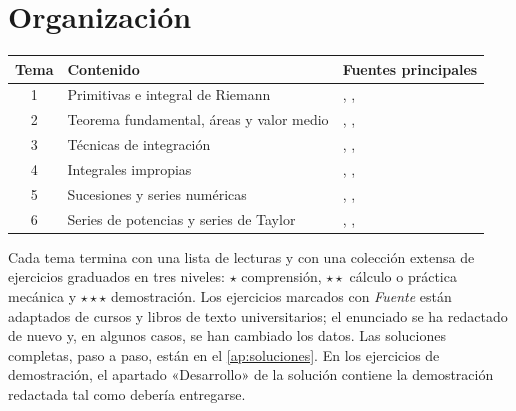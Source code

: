 \documentclass[11pt,a4paper,twoside,openany]{book}
\begin{document}
\section*{Organización}
\begin{center}
\begin{tabular}{@{}cll@{}}
\toprule
Tema & Contenido & Fuentes principales \\
\midrule
1 & Primitivas e integral de Riemann & \cite{spivak}, \cite{apostol}, \cite{openstax1} \\
2 & Teorema fundamental, áreas y valor medio & \cite{spivak}, \cite{mit1801}, \cite{openstax1} \\
3 & Técnicas de integración & \cite{openstax2}, \cite{strang}, \cite{mit1801} \\
4 & Integrales impropias & \cite{openstax2}, \cite{strang}, \cite{apostol} \\
5 & Sucesiones y series numéricas & \cite{openstax2}, \cite{strang}, \cite{spivak} \\
6 & Series de potencias y series de Taylor & \cite{openstax2}, \cite{strang}, \cite{spivak} \\
\bottomrule
\end{tabular}
\end{center}

Cada tema termina con una lista de lecturas y con una colección extensa de ejercicios graduados en tres niveles: $\star$ comprensión, $\star\star$ cálculo o práctica mecánica y $\star\star\star$ demostración. Los ejercicios marcados con \emph{Fuente} están adaptados de cursos y libros de texto universitarios; el enunciado se ha redactado de nuevo y, en algunos casos, se han cambiado los datos. Las soluciones completas, paso a paso, están en el \cref{ap:soluciones}. En los ejercicios de demostración, el apartado «Desarrollo» de la solución contiene la demostración redactada tal como debería entregarse.
\end{document}
